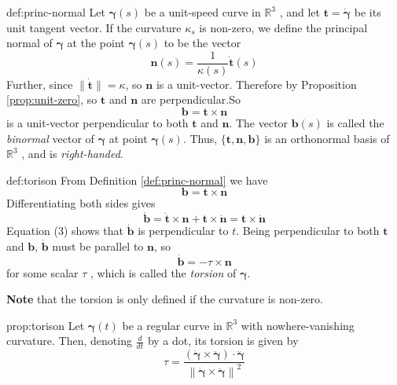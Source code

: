 \documentclass{notes}
\newcommand{\norm}[1]{\left\lVert #1 \right \rVert}
\begin{document}
\begin{definition}{def:princ-normal}
	Let \(\bm{\gamma}(s)\) be a unit-speed curve in \(\mathbb{R}^3\) , and let \(\mathbf{t} = \dot{\bm{\gamma}}\) be its unit tangent
	vector. If the curvature \(\kappa_s\) is non-zero, we define the principal normal of \(\bm{\gamma}\)
	at the point \(\bm{\gamma}(s)\) to be the vector
\[\mathbf{n}(s) = \frac{1}{\kappa(s)} \mathbf{\dot{t}}(s)\]
Further, since \(\lVert\mathbf{\dot{t}}\rVert = \kappa\), so \(\mathbf{n}\) is a unit-vector. Therefore by Proposition 
\ref{prop:unit-zero}, so \(\mathbf{t}\) and \(\mathbf{n}\) are perpendicular.So
\[\mathbf{b} = \mathbf{t} \times \mathbf{n}\]
is a unit-vector perpendicular to both \(\mathbf{t}\) and \(\mathbf{n}\). The vector \(\mathbf{b}(s)\) is called the 
\textit{binormal} vector of \(\bm{\gamma}\) at point \(\bm{\gamma}(s)\). Thus, \(\{ \mathbf{t}, \mathbf{n}, \mathbf{b}\}\) is an
 orthonormal basis of \(\mathbb{R}^3\)
, and is \textit{right-handed}.
\end{definition}

\begin{definition}{def:torison}
	From Definition \ref{def:princ-normal} we have
	\[\mathbf{b} = \mathbf{t} \times \mathbf{n}\]
	Differentiating both sides gives
	\[\dot{\mathbf{b}} = \dot{\mathbf{t}} \times \mathbf{n} + \mathbf{t} \times \dot{\mathbf{n}} = \mathbf{t} \times \dot{\mathbf{n}} \tag{(3)}\]
	Equation (3) shows
	that \(\dot{\mathbf{b}}\) is perpendicular to \(t\). Being perpendicular to both \(\mathbf{t}\) and \(\mathbf{b}\), \(\dot{\mathbf{b}}\) must be
	parallel to \(\mathbf{n}\), so
	\[\dot{\mathbf{b}} = -\tau \times  \mathbf{n}\]
	for some scalar \(\tau\) , which is called the \textit{torsion} of \(\bm{\gamma}\).
	
	\textbf{Note} that the torsion
	is only defined if the curvature is non-zero.
\end{definition}

\begin{definition}{prop:torison}
	Let \(\bm{\gamma}(t)\) be a regular curve in \(\mathbb{R}^3\) with nowhere-vanishing curvature. Then,
	denoting \(\frac{d}{dt}\) by a dot, its torsion is given by
	\[\tau = \dfrac{(\dot{\bm{\gamma}} \times \ddot{\bm{\gamma}})\cdot\dddot{\bm{\gamma}}}{\norm{\dot{\bm{\gamma}} \times \ddot{\bm{\gamma}}}^2}\]
\end{definition}
\end{document}
